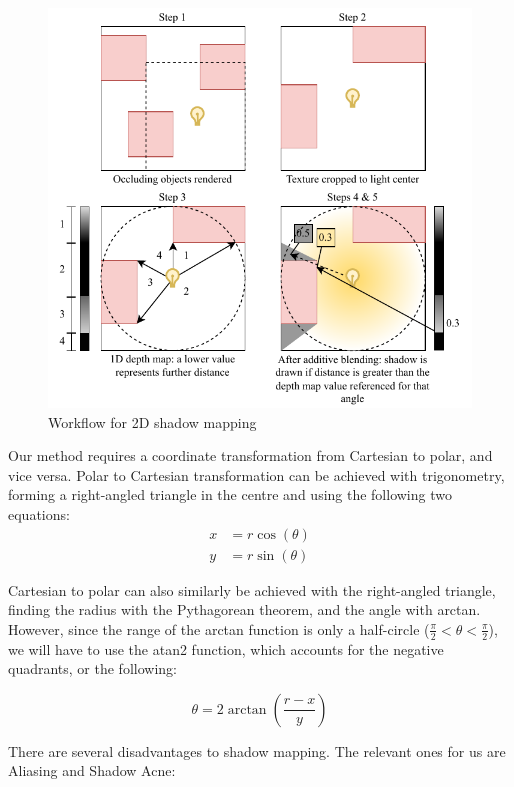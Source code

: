 \documentclass[../main/main.tex]{subfiles}
\begin{document}
\begin{figure}[H]
    \centering
    \includegraphics[width=\columnwidth]{../design/assets/shadow_mapping.pdf}
    \caption{Workflow for 2D shadow mapping}
    \label{fig:shadow-mapping}
\end{figure}

Our method requires a coordinate transformation from Cartesian to polar, and vice versa. Polar to Cartesian transformation can be achieved with trigonometry, forming a right-angled triangle in the centre and using the following two equations:
\begin{align*}
x &= r\cos(\theta)\\
y &= r\sin(\theta)
\end{align*}

Cartesian to polar can also similarly be achieved with the right-angled triangle, finding the radius with the Pythagorean theorem, and the angle with arctan. However, since the range of the arctan function is only a half-circle ($\frac{\pi}{2} < \theta < \frac{\pi}{2}$), we will have to use the atan2 function, which accounts for the negative quadrants, or the following:

\begin{equation*}
\theta = 2\arctan\left(\frac{r - x}{y}\right)
\end{equation*}

There are several disadvantages to shadow mapping. The relevant ones for us are Aliasing and Shadow Acne:
\end{document}
